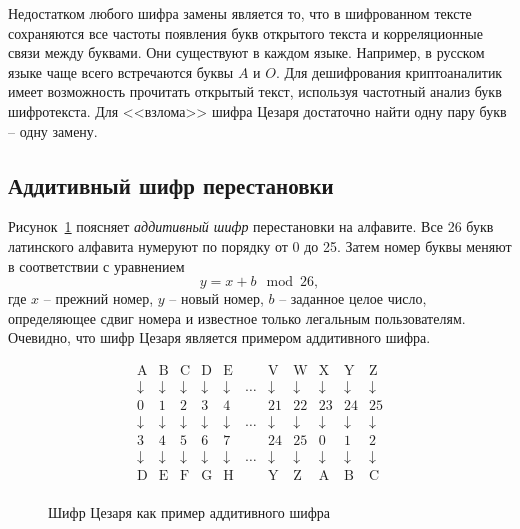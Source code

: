 Недостатком любого шифра замены является то, что в шифрованном тексте сохраняются все частоты появления букв открытого текста и корреляционные связи между буквами. Они существуют в каждом языке. Например, в русском языке чаще всего встречаются буквы $A$ и $O$. Для дешифрования криптоаналитик имеет возможность прочитать открытый текст, используя частотный анализ букв шифротекста. Для <<взлома>> шифра Цезаря достаточно найти одну пару букв -- одну замену.

\subsection{Аддитивный шифр перестановки}

Рисунок~\ref{fig:caesar-additiv} поясняет \emph{аддитивный шифр} перестановки на алфавите. Все 26 букв латинского алфавита нумеруют по порядку от 0 до 25. Затем номер буквы меняют в соответствии с уравнением
    \[ y = x + b \mod 26, \]
где $x$ -- прежний номер, $y$ -- новый номер, $b$ -- заданное целое число, определяющее сдвиг номера и известное только легальным пользователям. Очевидно, что шифр Цезаря является примером аддитивного шифра.

\begin{figure}[thb]
\[ \begin{array}{ccccccccccc}
    \text{A} & \text{B} & \text{C} & \text{D} & \text{E} & & \text{V} & \text{W} & \text{X} & \text{Y} & \text{Z} \\
    \downarrow & \downarrow & \downarrow & \downarrow & \downarrow & \dots & \downarrow & \downarrow & \downarrow & \downarrow & \downarrow \\
    0 & 1 & 2 & 3 & 4 & & 21 & 22 & 23 & 24 & 25 \\
    \downarrow & \downarrow & \downarrow & \downarrow & \downarrow & \dots & \downarrow & \downarrow & \downarrow & \downarrow & \downarrow \\
    3 & 4 & 5 & 6 & 7 & & 24 & 25 & 0 & 1 & 2 \\
    \downarrow & \downarrow & \downarrow & \downarrow & \downarrow & \dots & \downarrow & \downarrow & \downarrow & \downarrow & \downarrow \\
    \text{D} & \text{E} & \text{F} & \text{G} & \text{H} & & \text{Y} & \text{Z} & \text{A} & \text{B} & \text{C} \\
\end{array} \]
	\caption{Шифр Цезаря как пример аддитивного шифра}
	\label{fig:caesar-additiv}
\end{figure}


